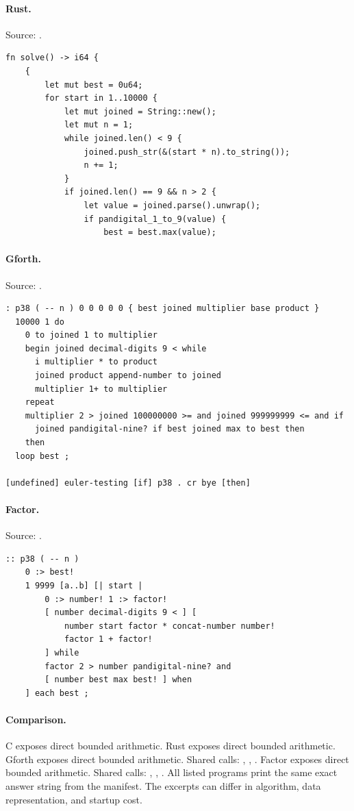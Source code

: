 \paragraph{Rust.} Source: .
\begin{lstlisting}
fn solve() -> i64 {
    {
        let mut best = 0u64;
        for start in 1..10000 {
            let mut joined = String::new();
            let mut n = 1;
            while joined.len() < 9 {
                joined.push_str(&(start * n).to_string());
                n += 1;
            }
            if joined.len() == 9 && n > 2 {
                let value = joined.parse().unwrap();
                if pandigital_1_to_9(value) {
                    best = best.max(value);
\end{lstlisting}

\paragraph{Gforth.} Source: .
\begin{lstlisting}
: p38 ( -- n ) 0 0 0 0 0 { best joined multiplier base product }
  10000 1 do
    0 to joined 1 to multiplier
    begin joined decimal-digits 9 < while
      i multiplier * to product
      joined product append-number to joined
      multiplier 1+ to multiplier
    repeat
    multiplier 2 > joined 100000000 >= and joined 999999999 <= and if
      joined pandigital-nine? if best joined max to best then
    then
  loop best ;

[undefined] euler-testing [if] p38 . cr bye [then]
\end{lstlisting}

\paragraph{Factor.} Source: .
\begin{lstlisting}
:: p38 ( -- n )
    0 :> best!
    1 9999 [a..b] [| start |
        0 :> number! 1 :> factor!
        [ number decimal-digits 9 < ] [
            number start factor * concat-number number!
            factor 1 + factor!
        ] while
        factor 2 > number pandigital-nine? and
        [ number best max best! ] when
    ] each best ;
\end{lstlisting}

\paragraph{Comparison.}
C exposes direct bounded arithmetic. Rust exposes direct bounded arithmetic. Gforth exposes direct bounded arithmetic. Shared calls: \texttt{}, \texttt{}, \texttt{}. Factor exposes direct bounded arithmetic. Shared calls: \texttt{}, \texttt{}, \texttt{}.
All listed programs print the same exact answer string from the manifest. The excerpts can differ in algorithm, data representation, and startup cost.

